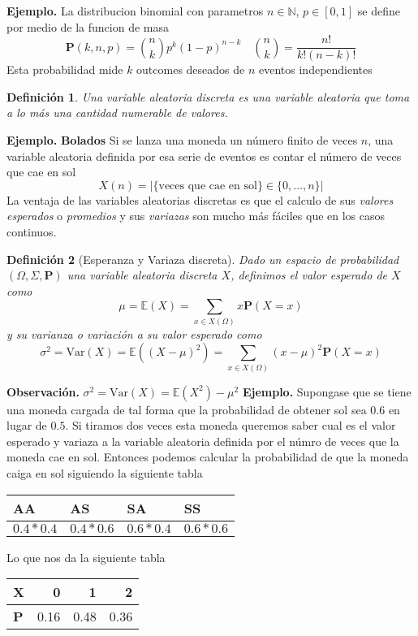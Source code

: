 \documentclass[letterpaper]{article}
\newtheorem{def.}{Definici\'on}[section]
\newcommand{\nat}{\ensuremath{ \mathbb N }}
\newcommand{\prob}{\textbf{P}}
\newcommand{\esp}{\mathbb E}
\newcommand{\eje}{{\newline \noindent \sc \textbf{Ejemplo. }}}
\newcommand{\obs}{{\newline \noindent \sc \textbf{Observación. }}}
\newcommand{\om}{\ensuremath{\Omega}}
\newcommand{\sig}{\ensuremath{\Sigma}}
\begin{document}
\eje La distribucion binomial con parametros \(n\in\nat\), \(p\in[0,1]\) se define por medio de la funcion de masa
\[
    \prob(k,n,p)={n\choose k}p^{k}(1-p)^{n-k}\quad{n\choose k}=\frac{n!}{k!(n-k)!}
\]
Esta probabilidad mide \(k\) outcomes deseados de \(n\) eventos independientes
\begin{def.}
Una variable aleatoria discreta es una variable aleatoria que toma a lo más una cantidad numerable de valores.
\end{def.}
\eje \textbf{Bolados} Si se lanza una moneda un número finito de veces \(n\), una variable aleatoria definida por esa serie de eventos es contar el número de veces que cae en sol
\[
    X(n)=|\{\text{veces que cae en sol}\}\in\{0,\dots,n\}|
\]
La ventaja de las variables aleatorias discretas es que el calculo de sus \emph{valores esperados} o \emph{promedios} y sus \emph{variazas} son mucho más fáciles que en los casos continuos.
\begin{def.}[Esperanza y Variaza discreta]
Dado un espacio de probabilidad \((\om,\sig,\prob)\) una variable aleatoria discreta \(X\), definimos el valor esperado de \(X\) como
\[
    \mu=\esp(X)=\sum_{x\in X(\om)} x\prob(X=x)
\]
y su varianza o variación a su valor esperado como
\[
    \sigma^2=\mathrm{Var}(X)=\esp((X-\mu)^2)=\sum_{x\in X(\om)} (x-\mu)^2\prob(X=x)
\]
\end{def.}
\obs \(\sigma^2=\mathrm{Var}(X)=\esp(X^2)-\mu^2\)
\eje Supongase que se tiene una moneda cargada de tal forma que la probabilidad de obtener sol sea \(0.6\) en lugar de \(0.5\). Si tiramos dos veces esta moneda queremos saber cual es el valor esperado y variaza a la variable aleatoria definida por el númro de veces que la moneda cae en sol. Entonces podemos calcular la probabilidad de que la moneda caiga en sol siguiendo la siguiente tabla
\begin{center}
\begin{tabular}{llll}
AA & AS & SA & SS\\
\hline
\(0.4*0.4\) & \(0.4*0.6\) & \(0.6*0.4\) & \(0.6*0.6\)\\
\end{tabular}
\end{center}
Lo que nos da la siguiente tabla
\begin{center}
\begin{tabular}{lrrr}
X & 0 & 1 & 2\\
\hline
\textbf{P} & 0.16 & 0.48 & 0.36\\
\end{tabular}
\end{center}
\end{document}
